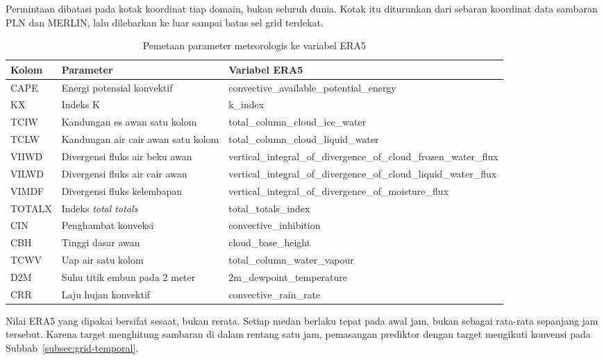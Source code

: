 Permintaan dibatasi pada kotak koordinat tiap domain, bukan seluruh dunia.
Kotak itu diturunkan dari sebaran koordinat data sambaran PLN dan MERLIN, lalu dilebarkan ke luar sampai batas sel grid terdekat.

\begin{table}[!t]
  \caption{Pemetaan parameter meteorologis ke variabel ERA5}
  \label{tab:era5-variabel}
  \footnotesize
  \begin{tabular}{ | l | p{} | p{} | }
    \hline
    Kolom & Parameter & Variabel ERA5 \\
    \hline
    CAPE & Energi potensial konvektif & convective\_available\_\newline potential\_energy \\
    KX & Indeks K & k\_index \\
    TCIW & Kandungan es awan satu kolom & total\_column\_cloud\_ice\_water \\
    TCLW & Kandungan air cair awan satu kolom & total\_column\_cloud\_liquid\_\newline water \\
    VIIWD & Divergensi fluks air beku awan & vertical\_integral\_of\_divergence\_\newline of\_cloud\_frozen\_water\_flux \\
    VILWD & Divergensi fluks air cair awan & vertical\_integral\_of\_divergence\_\newline of\_cloud\_liquid\_water\_flux \\
    VIMDF & Divergensi fluks kelembapan & vertical\_integral\_of\_divergence\_\newline of\_moisture\_flux \\
    TOTALX & Indeks \textit{total totals} & total\_totals\_index \\
    CIN & Penghambat konveksi & convective\_inhibition \\
    CBH & Tinggi dasar awan & cloud\_base\_height \\
    TCWV & Uap air satu kolom & total\_column\_water\_vapour \\
    D2M & Suhu titik embun pada 2 meter & 2m\_dewpoint\_temperature \\
    CRR & Laju hujan konvektif & convective\_rain\_rate \\
    \hline
  \end{tabular}
\end{table}

Nilai ERA5 yang dipakai bersifat sesaat, bukan rerata.
Setiap medan berlaku tepat pada awal jam, bukan sebagai rata-rata sepanjang jam tersebut.
Karena target menghitung sambaran di dalam rentang satu jam, pemasangan prediktor dengan target mengikuti konvensi pada Subbab~\ref{subsec:grid-temporal}.

